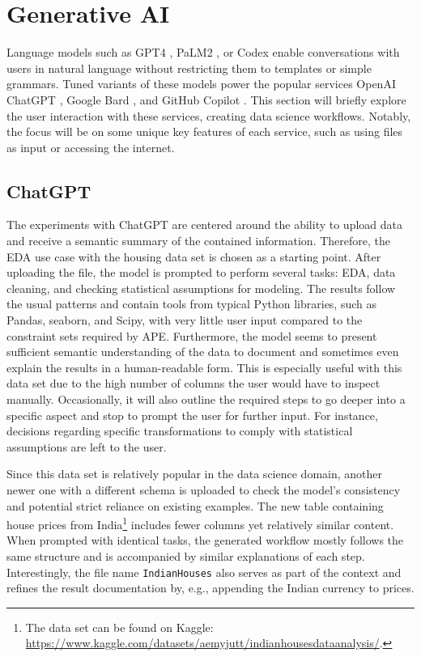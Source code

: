 \section{Generative AI}

Language models such as GPT4 \cite{openai2023gpt4}, PaLM2 \cite{anil2023palm}, or Codex \cite{openAI2021codex} enable conversations with users in natural language without restricting them to templates or simple grammars. Tuned variants of these models power the popular services OpenAI ChatGPT \cite{ChatGPT}, Google Bard \cite{anil2023palm,Bard}, and GitHub Copilot \cite{openAI2021codex,copilot2023robustness}. This section will briefly explore the user interaction with these services, creating data science workflows. Notably, the focus will be on some unique key features of each service, such as using files as input or accessing the internet.

\subsection{ChatGPT}
The experiments with ChatGPT are centered around the ability to upload data and receive a semantic summary of the contained information. Therefore, the EDA use case with the housing data set is chosen as a starting point. After uploading the file, the model is prompted to perform several tasks: EDA, data cleaning, and checking statistical assumptions for modeling. The results follow the usual patterns and contain tools from typical Python libraries, such as Pandas, seaborn, and Scipy, with very little user input compared to the constraint sets required by APE. Furthermore, the model seems to present sufficient semantic understanding of the data to document and sometimes even explain the results in a human-readable form. This is especially useful with this data set due to the high number of columns the user would have to inspect manually. Occasionally, it will also outline the required steps to go deeper into a specific aspect and stop to prompt the user for further input. For instance, decisions regarding specific transformations to comply with statistical assumptions are left to the user.

Since this data set is relatively popular in the data science domain, another newer one with a different schema is uploaded to check the model's consistency and potential strict reliance on existing examples. The new table containing house prices from India\footnote{The data set can be found on Kaggle: \url{https://www.kaggle.com/datasets/aemyjutt/indianhousesdataanalysis/}.} includes fewer columns yet relatively similar content. When prompted with identical tasks, the generated workflow mostly follows the same structure and is accompanied by similar explanations of each step. Interestingly, the file name \verb|IndianHouses| also serves as part of the context and refines the result documentation by, e.g., appending the Indian currency to prices.

